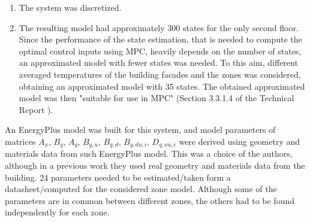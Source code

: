 {\begin{enumerate}
\begin{itemize}
		\item effects due to the AHU were considered.
	\end{itemize}
	\item The system was discretized.
	\item The resulting model had approximately 300 states for the only second floor.
	Since the performance of the state estimation, that is needed to compute the optimal control inputs using MPC, heavily depends on the number of states, an approximated model with fewer states was needed.
	To this aim, different averaged temperatures of the building facades and the zones was considered, obtaining an approximated model with 35 states. The obtained approximated model was then "suitable for use in MPC" (Section 3.3.1.4 of the Technical Report \cite{SturzeneggerTR}).
\end{enumerate}
An EnergyPlus model was built for this system, and model parameters of matrices $A_x$, $B_q$, $A_q$, $B_{q,u}$, $B_{q,d}$, $B_{q,du,i}$, $D_{q,xu,i}$ were derived using geometry and materials data from such EnergyPlus model.
This was a choice of the authors, although in a previous work they used real geometry and materials data from the building. 24 parameters needed to be estimated/taken form a datasheet/computed for the considered zone model.
Although some of the parameters are in common between different zones, the others had to be found independently for each zone. }

